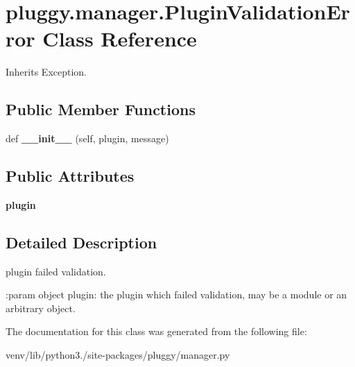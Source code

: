 \hypertarget{classpluggy_1_1manager_1_1_plugin_validation_error}{}\section{pluggy.\+manager.\+Plugin\+Validation\+Error Class Reference}
\label{classpluggy_1_1manager_1_1_plugin_validation_error}


Inherits Exception.

\subsection*{Public Member Functions}
\begin{DoxyCompactItemize}
\item 
\mbox{\label{classpluggy_1_1manager_1_1_plugin_validation_error_a528658dcafe009078c661442dda19642}} 
def {\bfseries \+\_\+\+\_\+init\+\_\+\+\_\+} (self, plugin, message)
\end{DoxyCompactItemize}
\subsection*{Public Attributes}
\begin{DoxyCompactItemize}
\item 
\mbox{\label{classpluggy_1_1manager_1_1_plugin_validation_error_add5b9adf796c8c30226ecc8b03097026}} 
{\bfseries plugin}
\end{DoxyCompactItemize}


\subsection{Detailed Description}
\begin{DoxyVerb}plugin failed validation.

:param object plugin: the plugin which failed validation,
    may be a module or an arbitrary object.
\end{DoxyVerb}
 

The documentation for this class was generated from the following file\+:\begin{DoxyCompactItemize}
\item 
venv/lib/python3./site-\/packages/pluggy/manager.\+py\end{DoxyCompactItemize}
